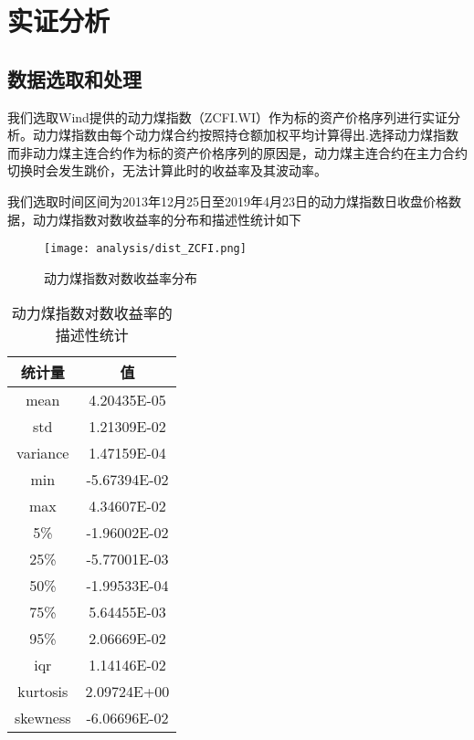 
\chapter{实证分析}
\label{chap:empirical}

\section{数据选取和处理}

我们选取Wind提供的动力煤指数（ZCFI.WI）作为标的资产价格序列进行实证分析。动力煤指数由每个动力煤合约按照持仓额加权平均计算得出.选择动力煤指数而非动力煤主连合约作为标的资产价格序列的原因是，动力煤主连合约在主力合约切换时会发生跳价，无法计算此时的收益率及其波动率。

我们选取时间区间为2013年12月25日至2019年4月23日的动力煤指数日收盘价格数据，动力煤指数对数收益率的分布和描述性统计如下

\begin{figure}[htb]
  \centering
  \texttt{[image: analysis/dist\_ZCFI.png]}
  \caption[这里将出现在插图索引中]
    {动力煤指数对数收益率分布}
  \label{fig:ZCFI_describe}
\end{figure}

\begin{table}[htbp]
  \centering
  \caption{动力煤指数对数收益率的描述性统计}
  \label{tab:ZCFI_describe}
  \begin{tabular}{cc}
    \toprule
    统计量 & 值 \\
    \midrule
    mean & 4.20435E-05 \\
    std & 1.21309E-02 \\
    variance & 1.47159E-04 \\
    min & -5.67394E-02 \\
    max & 4.34607E-02 \\
    5\% & -1.96002E-02 \\
    25\% & -5.77001E-03 \\
    50\% & -1.99533E-04 \\
    75\% & 5.64455E-03 \\
    95\% & 2.06669E-02 \\
    iqr & 1.14146E-02 \\
    kurtosis & 2.09724E+00 \\
    skewness & -6.06696E-02 \\
    \bottomrule
  \end{tabular}
\end{table}

